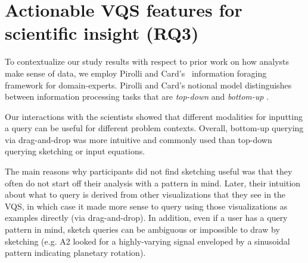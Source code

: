 \section{Actionable VQS features for scientific insight (RQ3)} \label{VQS_features_discussion}
To contextualize our study results with respect to prior work on how analysts make sense of data, we employ Pirolli and Card's~\cite{Pirolli} information foraging framework for domain-experts. Pirolli and Card's notional model distinguishes between information processing tasks that are \textit{top-down}  and \textit{bottom-up} .  
\par Our interactions with the scientists showed that different modalities for inputting a query can be useful for different problem contexts.  Overall,  bottom-up querying via drag-and-drop was more intuitive and commonly used than top-down querying  sketching or input equations. 
\par The main reasons why participants did not find sketching useful was that they often do not start off their analysis with a pattern in mind. Later, their intuition about what to query is derived from other visualizations that they see in the VQS, in which case it made more sense to query using those visualizations as examples directly (via drag-and-drop). In addition, even if a user has a query pattern in mind, sketch queries can be ambiguous \cite{correll2016semantics} or impossible to draw by sketching (e.g. A2 looked for a highly-varying signal enveloped by a sinusoidal pattern indicating planetary rotation). 
